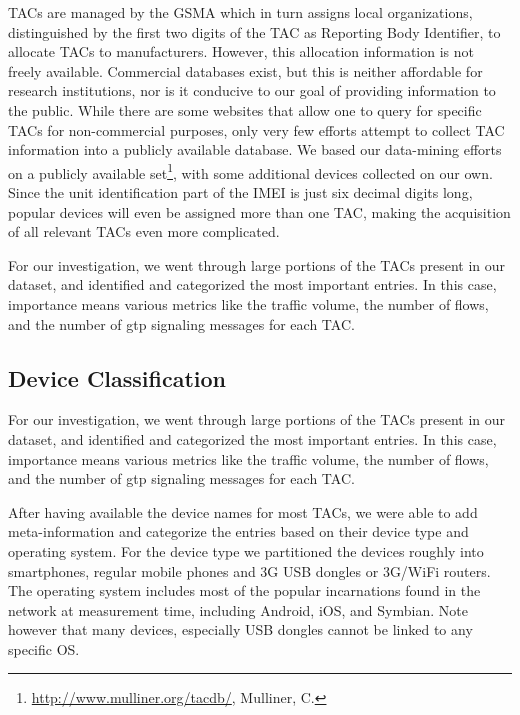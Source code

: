 \glspl{TAC} are managed by the \gls{GSMA} which in turn assigns local organizations, distinguished by the first two digits of the \gls{TAC} as Reporting Body Identifier, to allocate \glspl{TAC} to manufacturers. However, this allocation information is not freely available. Commercial databases exist, but this is neither affordable for research institutions, nor is it conducive to our goal of providing information to the public. While there are some websites that allow one to query for specific \glspl{TAC} for non-commercial purposes, only very few efforts attempt to collect \gls{TAC} information into a publicly available database. We based our data-mining efforts on a publicly available set\footnote{\url{http://www.mulliner.org/tacdb/}, Mulliner, C.}, with some additional devices collected on our own. Since the unit identification part of the \gls{IMEI} is just six decimal digits long, popular devices will even be assigned more than one TAC, making the acquisition of all relevant \glspl{TAC} even more complicated.

For our investigation, we went through large portions of the \glspl{TAC} present in our dataset, and identified and categorized the most important entries. In this case, importance means various metrics like the traffic volume, the number of flows, and the number of \gls{gtp} signaling messages for each \gls{TAC}. 


\subsection{Device Classification}

For our investigation, we went through large portions of the \glspl{TAC} present in our dataset, and identified and categorized the most important entries. In this case, importance means various metrics like the traffic volume, the number of flows, and the number of \gls{gtp} signaling messages for each \gls{TAC}. 


After having available the device names for most \glspl{TAC}, we were able to add meta-information and categorize the entries based on their device type and operating system. For the device type we partitioned the devices roughly into smartphones, regular mobile phones and 3G USB dongles or 3G/WiFi routers. The operating system includes most of the popular incarnations found in the network at measurement time, including Android, iOS, and Symbian. Note however that many devices, especially USB dongles cannot be linked to any specific OS.


